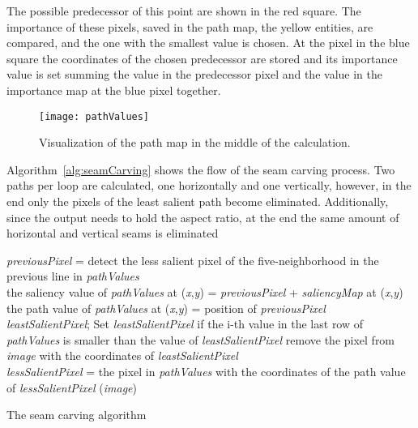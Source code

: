 \documentclass[draft,final]{vutinfth} %
\begin{document}
	The possible predecessor of this point are shown in the red square.
	The importance of these pixels, saved in the path map, the yellow entities, are compared, and the one with the smallest value is chosen.
	At the pixel in the blue square the coordinates of the chosen predecessor are stored and its importance value is set summing the value in the predecessor pixel and the value in the importance map at the blue pixel together. 
	\begin{figure}[H]
		\centering		
		\texttt{[image: pathValues]}
		\caption{Visualization of the path map in the middle of the calculation.}
		\label{fig:pathValues}
	\end{figure}
	Algorithm~\ref{alg:seamCarving} shows the flow of the seam carving process.
	Two paths per loop are calculated, one horizontally and one vertically, however, in the end only the pixels of the least salient path become eliminated.
	Additionally, since the output needs to hold the aspect ratio, at the end the same amount of horizontal and vertical seams is eliminated\par 
	\begin{algorithm}
		{
			{
				\textit{previousPixel} = detect the less salient pixel of the five-neighborhood in the previous line in \textit{pathValues} \\
				the saliency value of \textit{pathValues} at (\textit{x},\textit{y}) = \textit{previousPixel} + \textit{saliencyMap} at (\textit{x},\textit{y}) \\
				the path value of \textit{pathValues} at (\textit{x},\textit{y}) = position of  \textit{previousPixel}\\
			}
		}
		\textit{leastSalientPixel};
			{
			  Set \textit{leastSalientPixel} if the i-th value in the last row of  \textit{pathValues} is smaller than the value of \textit{leastSalientPixel}
			}
		{
			remove the pixel from \textit{image} with the coordinates of \textit{leastSalientPixel}\\
			\textit{lessSalientPixel} = the pixel in \textit{pathValues} with the coordinates of the path value of \textit{lessSalientPixel}
		}
		\Return(\textit{image})
		\caption{The seam carving algorithm}
		\label{alg:seamCarving}
	\end{algorithm}
\end{document}

